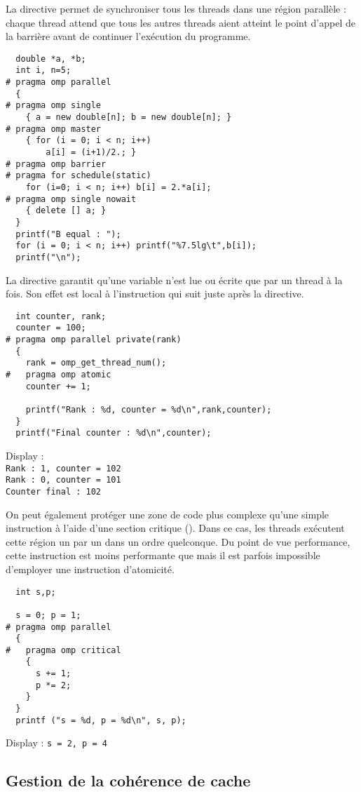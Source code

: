 \documentclass[fleqn,11pt]{article}
\begin{document}
La directive \verb@barrier@ permet de synchroniser tous les threads dans une région
parallèle : chaque thread attend que tous les autres threads aient atteint le point
d'appel de la barrière avant de continuer l'exécution du programme.

\begin{lstlisting}
  double *a, *b;
  int i, n=5;
# pragma omp parallel
  {
# pragma omp single
    { a = new double[n]; b = new double[n]; }
# pragma omp master
    { for (i = 0; i < n; i++)
        a[i] = (i+1)/2.; }
# pragma omp barrier
# pragma for schedule(static)
    for (i=0; i < n; i++) b[i] = 2.*a[i];
# pragma omp single nowait
    { delete [] a; }
  }
  printf("B equal : ");
  for (i = 0; i < n; i++) printf("%7.5lg\t",b[i]);
  printf("\n");
\end{lstlisting}

La directive \verb@atomic@ garantit qu'une variable n'est lue ou écrite que par un thread à la
fois. Son effet est local à l'instruction qui suit juste après la directive.

\begin{lstlisting}
  int counter, rank;
  counter = 100;
# pragma omp parallel private(rank)
  {
    rank = omp_get_thread_num();
#   pragma omp atomic
    counter += 1;
    
    printf("Rank : %d, counter = %d\n",rank,counter);
  }
  printf("Final counter : %d\n",counter);
\end{lstlisting}

Display :\\
\texttt{Rank : 1, counter = 102 \\
Rank : 0, counter = 101\\
Counter final : 102}

On peut également protéger une zone de code plus complexe
qu'une simple instruction à l'aide d'une section critique (\verb@critical@).
Dans ce cas, les threads exécutent cette région un par un
dans un ordre quelconque. Du point de vue performance,
cette instruction est moins performante que \verb@atomic@
mais il est parfois impossible d'employer une instruction
d'atomicité.

\begin{lstlisting}
  int s,p;

  s = 0; p = 1;
# pragma omp parallel
  {
#   pragma omp critical
    {
      s += 1;
      p *= 2;
    }
  }
  printf ("s = %d, p = %d\n", s, p);
\end{lstlisting}
Display : \texttt{s = 2, p = 4}

\subsection{Gestion de la cohérence de cache}
\end{document}
